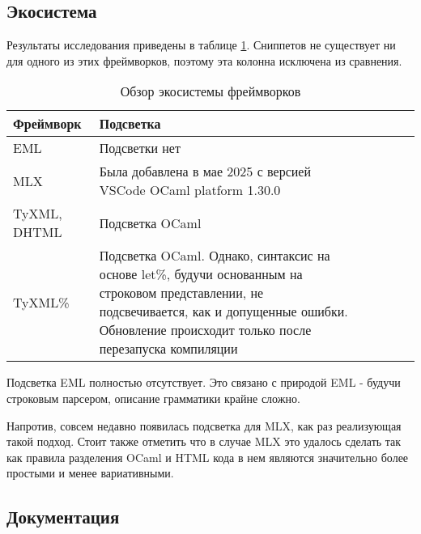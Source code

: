 \subsection{Экосистема}

Результаты исследования приведены в таблице \ref{tab:ecosystem}.
Сниппетов не существует ни для одного из этих фреймворков, поэтому эта колонна исключена из сравнения.

\begin{table}[h!]
    \begin{tabularx}{\linewidth}{l>{\raggedright\arraybackslash}X>{\raggedright\arraybackslash}XcXX}
        \toprule
        \textbf{Фреймворк} & \textbf{Подсветка} \\
        \midrule
        EML & \cellcolor{yellow!30} Подсветки нет \\
        MLX & Была добавлена в мае 2025 с версией VSCode OCaml platform 1.30.0 \\
        TyXML, DHTML & Подсветка OCaml \\
        TyXML\% & Подсветка OCaml. Однако, синтаксис на основе let\%, будучи основанным на строковом представлении, не подсвечивается, как и допущенные ошибки. Обновление происходит только после перезапуска компиляции \\
        \bottomrule
    \end{tabularx}
    \caption{Обзор экосистемы фреймворков}
    \label{tab:ecosystem}
\end{table}

Подсветка EML полностью отсутствует.
Это связано с природой EML - будучи строковым парсером, описание грамматики крайне сложно.

Напротив, совсем недавно появилась подсветка для MLX, как раз реализующая такой подход.
Стоит также отметить что в случае MLX это удалось сделать так как правила разделения OCaml и HTML кода в нем являются значительно более простыми и менее вариативными.


\subsection{Документация}

